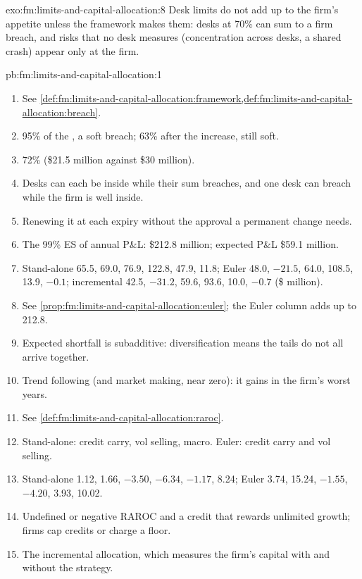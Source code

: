 \begin{solution}{exo:fm:limits-and-capital-allocation:8}
Desk limits do not add up to the firm's appetite unless the framework makes them: desks at 70\% can sum to a firm breach, and risks that no desk
measures (concentration across desks, a shared crash) appear only at the firm.
\end{solution}

\begin{solution}{pb:fm:limits-and-capital-allocation:1}
\begin{enumerate}
\item See \cref{def:fm:limits-and-capital-allocation:framework,def:fm:limits-and-capital-allocation:breach}.
\item 95\% of the , a soft breach; 63\% after the increase, still soft.
\item 72\% (\$21.5 million against \$30 million).
\item Desks can each be inside while their sum breaches, and one desk can breach while the firm is well inside.
\item Renewing it at each expiry without the approval a permanent change needs.
\item The 99\% ES of annual P\&L: \$212.8 million; expected P\&L \$59.1 million.
\item Stand-alone 65.5, 69.0, 76.9, 122.8, 47.9, 11.8; Euler 48.0, $-21.5$, 64.0, 108.5, 13.9, $-0.1$; incremental 42.5, $-31.2$, 59.6, 93.6, 10.0,
$-0.7$ (\$ million).
\item See \cref{prop:fm:limits-and-capital-allocation:euler}; the Euler column adds up to 212.8.
\item Expected shortfall is subadditive: diversification means the tails do not all arrive together.
\item Trend following (and market making, near zero): it gains in the firm's worst years.
\item See \cref{def:fm:limits-and-capital-allocation:raroc}.
\item Stand-alone: credit carry, vol selling, macro. Euler: credit carry and vol selling.
\item Stand-alone 1.12, 1.66, $-3.50$, $-6.34$, $-1.17$, 8.24; Euler 3.74, 15.24, $-1.55$, $-4.20$, 3.93, 10.02.
\item Undefined or negative RAROC and a credit that rewards unlimited growth; firms cap credits or charge a floor.
\item The incremental allocation, which measures the firm's capital with and without the strategy.

\end{enumerate}
\end{solution}
